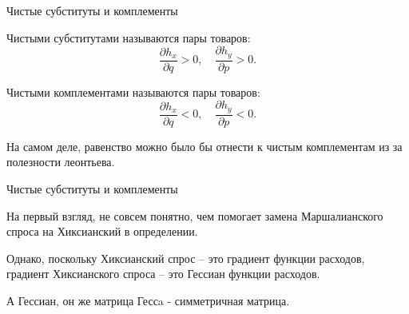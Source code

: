 \documentclass{beamer}
\begin{document}
\begin{frame}{Чистые субституты и комплементы}

\begin{definition}
\alert{Чистыми субститутами} называются пары товаров:
$$
\frac{\partial h_x}{\partial q} > 0, \quad \frac{\partial h_y}{\partial p} > 0.
$$

\alert{Чистыми комплементами} называются пары товаров: 
$$
\frac{\partial h_x}{\partial q} < 0, \quad \frac{\partial h_y}{\partial p} < 0.
$$
\end{definition}

На самом деле, равенство можно было бы отнести к чистым комплементам из за полезности леонтьева.

\end{frame}

\begin{frame}{Чистые субституты и комплементы}

На первый взгляд, не совсем понятно, чем помогает замена Маршалианского спроса на Хиксианский в определении. 

Однако, поскольку Хиксианский спрос – это градиент функции расходов, градиент Хиксианского спроса – это Гессиан функции расходов. 

А Гессиан, он же матрица Гессa - симметричная матрица.

\end{frame}
\end{document}
